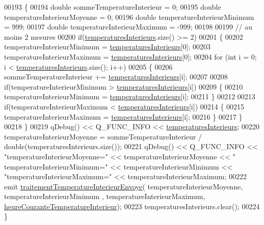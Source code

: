 \begin{DoxyCode}
00193 \{
00194     \textcolor{keywordtype}{double} sommeTemperatureInterieur = 0;
00195     \textcolor{keywordtype}{double} temperatureInterieurMoyenne = 0;
00196     \textcolor{keywordtype}{double} temperatureInterieurMinimum = 999;
00197     \textcolor{keywordtype}{double} temperatureInterieurMaximum = -999;
00198 
00199     \textcolor{comment}{// au moins 2 mesures}
00200     \textcolor{keywordflow}{if}(\hyperlink{class_infos_temperature_a39a976c10811a7589e4aba42586813c5}{temperaturesInterieurs}.size() >= 2)
00201     \{
00202         temperatureInterieurMinimum = \hyperlink{class_infos_temperature_a39a976c10811a7589e4aba42586813c5}{temperaturesInterieurs}[0];
00203         temperatureInterieurMaximum = \hyperlink{class_infos_temperature_a39a976c10811a7589e4aba42586813c5}{temperaturesInterieurs}[0];
00204         \textcolor{keywordflow}{for} (\textcolor{keywordtype}{int} i = 0; i < \hyperlink{class_infos_temperature_a39a976c10811a7589e4aba42586813c5}{temperaturesInterieurs}.size(); i++)
00205         \{
00206             sommeTemperatureInterieur += \hyperlink{class_infos_temperature_a39a976c10811a7589e4aba42586813c5}{temperaturesInterieurs}[i];
00207 
00208             \textcolor{keywordflow}{if}(temperatureInterieurMinimum > \hyperlink{class_infos_temperature_a39a976c10811a7589e4aba42586813c5}{temperaturesInterieurs}[i])
00209             \{
00210                 temperatureInterieurMinimum = \hyperlink{class_infos_temperature_a39a976c10811a7589e4aba42586813c5}{temperaturesInterieurs}[i];
00211             \}
00212 
00213             \textcolor{keywordflow}{if}(temperatureInterieurMaximum < \hyperlink{class_infos_temperature_a39a976c10811a7589e4aba42586813c5}{temperaturesInterieurs}[i])
00214             \{
00215                 temperatureInterieurMaximum = \hyperlink{class_infos_temperature_a39a976c10811a7589e4aba42586813c5}{temperaturesInterieurs}[i];
00216             \}
00217         \}
00218     \}
00219     qDebug() << Q\_FUNC\_INFO << \hyperlink{class_infos_temperature_a39a976c10811a7589e4aba42586813c5}{temperaturesInterieurs};
00220     temperatureInterieurMoyenne = sommeTemperatureInterieur / double(temperaturesInterieurs.size());
00221     qDebug() << Q\_FUNC\_INFO << \textcolor{stringliteral}{"temperatureInterieurMoyenne="} << temperatureInterieurMoyenne << \textcolor{stringliteral}{"
      temperatureInterieurMinimum="} << temperatureInterieurMinimum << \textcolor{stringliteral}{"temperatureInterieurMaximum="} << 
      temperatureInterieurMaximum;
00222     emit \hyperlink{class_infos_temperature_a2d7c580a215f918a79aac46a15ff24b9}{traitementTemperatureInterieurEnvoye}(
      temperatureInterieurMoyenne, temperatureInterieurMinimum , temperatureInterieurMaximum, 
      \hyperlink{class_infos_temperature_a708b70383d309fa0ba355dcc3921cc23}{heureCouranteTemperatureInterieur});
00223     temperaturesInterieurs.clear();
00224 \}
\end{DoxyCode}
